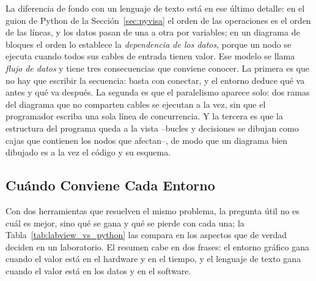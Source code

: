 La diferencia de fondo con un lenguaje de texto está en ese último detalle: en el guion de Python de la Sección~\ref{sec:pyvisa} el orden de las operaciones es el orden de las líneas, y los datos pasan de una a otra por variables; en un diagrama de bloques el orden lo establece la \emph{dependencia de los datos}, porque un nodo se ejecuta cuando todos sus cables de entrada tienen valor. Ese modelo se llama \emph{flujo de datos} y tiene tres consecuencias que conviene conocer. La primera es que no hay que escribir la secuencia: basta con conectar, y el entorno deduce qué va antes y qué va después. La segunda es que el paralelismo aparece solo: dos ramas del diagrama que no comparten cables se ejecutan a la vez, sin que el programador escriba una sola línea de concurrencia. Y la tercera es que la estructura del programa queda a la vista --bucles y decisiones se dibujan como cajas que contienen los nodos que afectan--, de modo que un diagrama bien dibujado es a la vez el código y su esquema.

\subsection{Cuándo Conviene Cada Entorno}\label{sub:labview_python}

Con dos herramientas que resuelven el mismo problema, la pregunta útil no es cuál es mejor, sino qué se gana y qué se pierde con cada una; la Tabla~\ref{tab:labview_vs_python} las compara en los aspectos que de verdad deciden en un laboratorio. El resumen cabe en dos frases: el entorno gráfico gana cuando el valor está en el hardware y en el tiempo, y el lenguaje de texto gana cuando el valor está en los datos y en el software.

